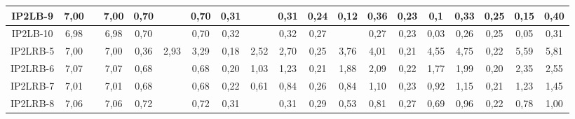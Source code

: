 \begin{table}[h]
{\begin{tabular}{c|c|c|c|c|c|c|c|c|c|c|c|c|c|c|c|c|c|c|}
\multicolumn{1}{|c|}{IP2LB-9} & {\color[HTML]{656565} 7,00} & {\color[HTML]{656565} } & 7,00 & {\color[HTML]{656565} 0,70} & {\color[HTML]{656565} } & 0,70 & {\color[HTML]{656565} 0,31} & {\color[HTML]{656565} } & 0,31 & {\color[HTML]{656565} 0,24} & {\color[HTML]{656565} 0,12} & 0,36 & {\color[HTML]{656565} 0,23} & {\color[HTML]{656565} 0,1} & 0,33 & {\color[HTML]{656565} 0,25} & {\color[HTML]{656565} 0,15} & 0,40 \\ \hline
\multicolumn{1}{|c|}{IP2LB-10} & {\color[HTML]{656565} 6,98} & {\color[HTML]{656565} } & 6,98 & {\color[HTML]{656565} 0,70} & {\color[HTML]{656565} } & 0,70 & {\color[HTML]{656565} 0,32} & {\color[HTML]{656565} } & 0,32 & {\color[HTML]{656565} 0,27} & {\color[HTML]{656565} } & 0,27 & {\color[HTML]{656565} 0,23} & {\color[HTML]{656565} 0,03} & 0,26 & {\color[HTML]{656565} 0,25} & {\color[HTML]{656565} 0,05} & 0,31 \\ \hline
\multicolumn{1}{|c|}{IP2LRB-5} & {\color[HTML]{656565} 7,00} & {\color[HTML]{656565} } & 7,00 & {\color[HTML]{656565} 0,36} & {\color[HTML]{656565} 2,93} & 3,29 & {\color[HTML]{656565} 0,18} & {\color[HTML]{656565} 2,52} & 2,70 & {\color[HTML]{656565} 0,25} & {\color[HTML]{656565} 3,76} & 4,01 & {\color[HTML]{656565} 0,21} & {\color[HTML]{656565} 4,55} & 4,75 & {\color[HTML]{656565} 0,22} & {\color[HTML]{656565} 5,59} & 5,81 \\ \hline
\multicolumn{1}{|c|}{IP2LRB-6} & {\color[HTML]{656565} 7,07} & {\color[HTML]{656565} } & 7,07 & {\color[HTML]{656565} 0,68} & {\color[HTML]{656565} } & 0,68 & {\color[HTML]{656565} 0,20} & {\color[HTML]{656565} 1,03} & 1,23 & {\color[HTML]{656565} 0,21} & {\color[HTML]{656565} 1,88} & 2,09 & {\color[HTML]{656565} 0,22} & {\color[HTML]{656565} 1,77} & 1,99 & {\color[HTML]{656565} 0,20} & {\color[HTML]{656565} 2,35} & 2,55 \\ \hline
\multicolumn{1}{|c|}{IP2LRB-7} & {\color[HTML]{656565} 7,01} & {\color[HTML]{656565} } & 7,01 & {\color[HTML]{656565} 0,68} & {\color[HTML]{656565} } & 0,68 & {\color[HTML]{656565} 0,22} & {\color[HTML]{656565} 0,61} & 0,84 & {\color[HTML]{656565} 0,26} & {\color[HTML]{656565} 0,84} & 1,10 & {\color[HTML]{656565} 0,23} & {\color[HTML]{656565} 0,92} & 1,15 & {\color[HTML]{656565} 0,21} & {\color[HTML]{656565} 1,23} & 1,45 \\ \hline
\multicolumn{1}{|c|}{IP2LRB-8} & {\color[HTML]{656565} 7,06} & {\color[HTML]{656565} } & 7,06 & {\color[HTML]{656565} 0,72} & {\color[HTML]{656565} } & 0,72 & {\color[HTML]{656565} 0,31} & {\color[HTML]{656565} } & 0,31 & {\color[HTML]{656565} 0,29} & {\color[HTML]{656565} 0,53} & 0,81 & {\color[HTML]{656565} 0,27} & {\color[HTML]{656565} 0,69} & 0,96 & {\color[HTML]{656565} 0,22} & {\color[HTML]{656565} 0,78} & 1,00 \\ \hline

\end{tabular}}
\end{table}
